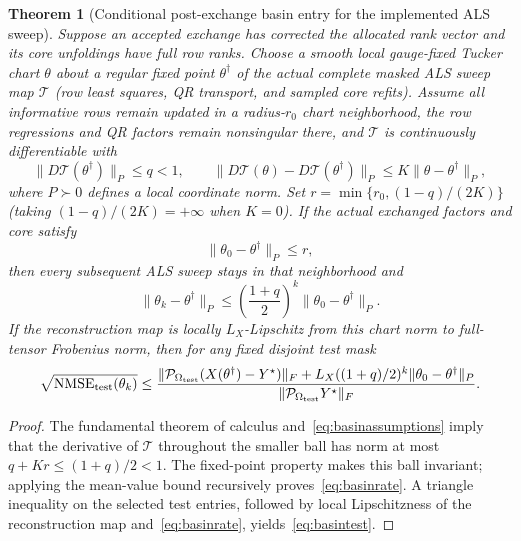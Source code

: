 \documentclass[review,10pt]{elsarticle}
\newtheorem{theorem}{Theorem}
\begin{document}
\begin{theorem}[Conditional post-exchange basin entry for the implemented ALS sweep]\label{thm:basin}
Suppose an accepted exchange has corrected the allocated rank vector and its core unfoldings have full row ranks. Choose a smooth local gauge-fixed Tucker chart $\theta$ about a regular fixed point $\theta^\dagger$ of the \emph{actual complete masked ALS sweep map} $\mathcal T$ (row least squares, QR transport, and sampled core refits). Assume all informative rows remain updated in a radius-$r_0$ chart neighborhood, the row regressions and QR factors remain nonsingular there, and $\mathcal T$ is continuously differentiable with
\begin{equation}\label{eq:basinassumptions}
\|D\mathcal T(\theta^\dagger)\|_P\le q<1,\qquad
\|D\mathcal T(\theta)-D\mathcal T(\theta^\dagger)\|_P
\le K\|\theta-\theta^\dagger\|_P,
\end{equation}
where $P\succ0$ defines a local coordinate norm. Set $r=\min\{r_0,(1-q)/(2K)\}$ (taking $(1-q)/(2K)=+\infty$ when $K=0$). If the actual exchanged factors and core satisfy
\begin{equation}\label{eq:basinentry}
 \|\theta_0-\theta^\dagger\|_P\le r,
\end{equation}
then every subsequent ALS sweep stays in that neighborhood and
\begin{equation}\label{eq:basinrate}
\boxed{\|\theta_k-\theta^\dagger\|_P
 \le\left(\frac{1+q}{2}\right)^k\|\theta_0-\theta^\dagger\|_P.}
\end{equation}
If the reconstruction map is locally $L_X$-Lipschitz from this chart norm to full-tensor Frobenius norm, then for any fixed disjoint test mask
\begin{equation}\label{eq:basintest}
\sqrt{\mathrm{NMSE}_{\rm test}(\theta_k)}\le
\frac{\|\mathcal P_{\Omega_{\rm test}}(X(\theta^\dagger)-Y^\star)\|_F
 +L_X((1+q)/2)^k\|\theta_0-\theta^\dagger\|_P}
{\|\mathcal P_{\Omega_{\rm test}}Y^\star\|_F}.
\end{equation}
\end{theorem}
\begin{proof}
The fundamental theorem of calculus and~\eqref{eq:basinassumptions} imply that the derivative of $\mathcal T$ throughout the smaller ball has norm at most $q+Kr\le(1+q)/2<1$. The fixed-point property makes this ball invariant; applying the mean-value bound recursively proves~\eqref{eq:basinrate}. A triangle inequality on the selected test entries, followed by local Lipschitzness of the reconstruction map and~\eqref{eq:basinrate}, yields~\eqref{eq:basintest}.
\end{proof}
\end{document}
